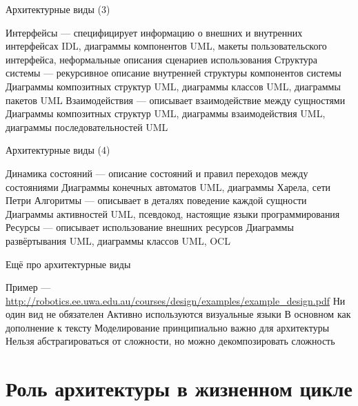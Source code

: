 \documentclass{../../slides-style}
\begin{document}
    \begin{frame}{Архитектурные виды (3)}
        \begin{outline}
            \1 Интерфейсы --- специфицирует информацию о внешних и внутренних интерфейсах
                \2 IDL, диаграммы компонентов UML, макеты пользовательского интерфейса, неформальные описания сценариев использования
            \1 Структура системы --- рекурсивное описание внутренней структуры компонентов системы
                \2 Диаграммы композитных структур UML, диаграммы классов UML, диаграммы пакетов UML
            \1 Взаимодействия --- описывает взаимодействие между сущностями
                \2 Диаграммы композитных структур UML, диаграммы взаимодействия UML, диаграммы последовательностей UML
        \end{outline}
    \end{frame}

    \begin{frame}{Архитектурные виды (4)}
        \begin{outline}
            \1 Динамика состояний --- описание состояний и правил переходов между состояниями
                \2 Диаграммы конечных автоматов UML, диаграммы Харела, сети Петри
            \1 Алгоритмы --- описывает в деталях поведение каждой сущности
                \2 Диаграммы активностей UML, псевдокод, настоящие языки программирования
            \1 Ресурсы --- описывает использование внешних ресурсов
                \2 Диаграммы развёртывания UML, диаграммы классов UML, OCL
        \end{outline}
    \end{frame}

    \begin{frame}{Ещё про архитектурные виды}
        \begin{outline}
            \1 Пример --- \url{http://robotics.ee.uwa.edu.au/courses/design/examples/example_design.pdf}
            \1 Ни один вид не обязателен
            \1 Активно используются визуальные языки
                \2 В основном как дополнение к тексту
            \1 Моделирование принципиально важно для архитектуры
                \2 Нельзя абстрагироваться от сложности, но можно декомпозировать сложность
        \end{outline}
    \end{frame}

    \section{Роль архитектуры в жизненном цикле}
\end{document}
